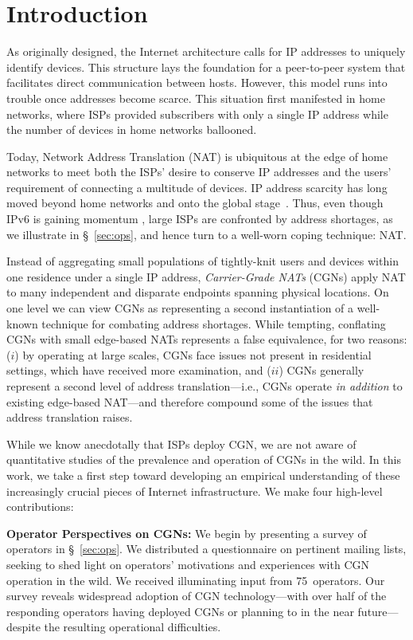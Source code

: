 \documentclass[10pt]{sig-alternate-05-2015}
\newcommand\xref[1]{\S~\ref{#1}}
\newcommand{\parax}[1]{\vspace{0.2em} \noindent \textbf{#1:}}
\begin{document}
\section{Introduction}
\label{sec:intro}

As originally designed, the Internet architecture calls for IP
addresses to uniquely identify devices.  This structure lays the
foundation for a peer-to-peer system that facilitates direct
communication between hosts.  However, this model runs into trouble
once addresses become scarce.  This situation first
manifested in home networks, where ISPs provided subscribers with only
a single IP address while the number of devices in
home networks ballooned.

Today, Network Address Translation (NAT)
\cite{rfc1631} is ubiquitous at the edge of home networks to meet
both the ISPs' desire to conserve IP addresses and the users'
requirement of connecting a multitude of devices.  IP
address scarcity has long moved beyond home networks and onto the
global stage~\cite{RABP14}.
Thus,
even though IPv6 is gaining momentum \cite{ipv6sigcomm14},
large ISPs are confronted by address shortages, as we
illustrate in \xref{sec:ops}, and hence
turn to a well-worn coping technique: NAT. 

Instead of aggregating small populations of tightly-knit users and
devices within one residence under a single IP address,
\textit{Carrier-Grade NATs} (CGNs) apply NAT to many independent and
disparate endpoints spanning physical locations.  On
one level we can view CGNs as representing a second instantiation of
a well-known technique for combating address shortages.  While
tempting, conflating CGNs with small edge-based NATs represents a
false equivalence, for two reasons: ($i$) by operating at large scales,
CGNs face issues not present in residential settings, which have
received more examination,
and ($ii$)
CGNs generally represent a second level of address
translation---i.e., CGNs operate \textit{in addition} to existing
edge-based NAT---and therefore compound some of the issues that address
translation raises.

While we know anecdotally that ISPs deploy CGN,
we are not aware of quantitative studies of the prevalence and
operation of CGNs in the wild.  In this work, we take a first step
toward developing an empirical understanding of these increasingly
crucial pieces of Internet infrastructure.  We make
four high-level contributions:

\parax{Operator Perspectives on CGNs}
We begin by presenting a survey of operators in \xref{sec:ops}.  We
distributed a questionnaire on pertinent mailing lists, seeking
to shed light on operators' motivations and experiences with CGN
operation in the wild.  We received illuminating input from
75~operators.
Our
survey reveals widespread adoption of CGN technology---with over
half of the responding operators having deployed CGNs or planning to in the near
future---despite the resulting operational difficulties.
\end{document}
